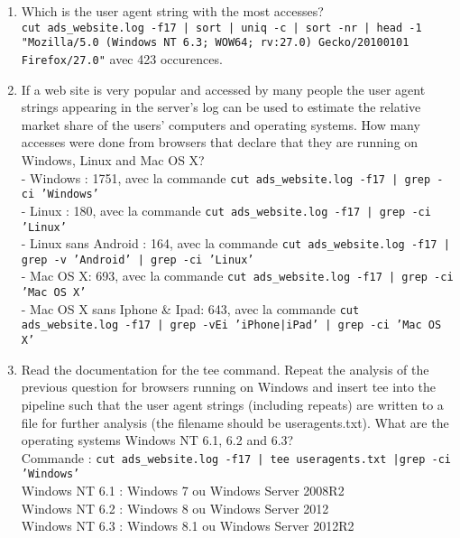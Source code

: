 \documentclass[a4paper,11pt]{article}
\newcounter{commande}[subsection]
\begin{document}
\begin{enumerate}
  \item Which is the user agent string with the most accesses?\\
  \texttt{cut ads\_website.log -f17 | sort | uniq -c | sort -nr | head -1}\\
  \texttt{"Mozilla/5.0 (Windows NT 6.3; WOW64; rv:27.0) Gecko/20100101 Firefox/27.0"} avec 423 occurences.\\
  
  
  \item If a web site is very popular and accessed by many people the user agent strings appearing in the server's log can be used to estimate the relative market share of the users' computers and operating systems. How many accesses were done from browsers that declare that they are running on Windows, Linux and Mac OS X? \\
  - Windows : 1751, avec la commande \texttt{cut ads\_website.log -f17 | grep -ci 'Windows'} \\
  - Linux   : 180, avec la commande \texttt{cut ads\_website.log -f17 | grep -ci 'Linux' 
}\\
  - Linux sans Android  : 164, avec la commande \texttt{cut ads\_website.log -f17 | grep -v 'Android' | grep -ci 'Linux'}\\
  - Mac OS X: 693, avec la commande \texttt{cut ads\_website.log -f17 | grep -ci 'Mac OS X' 
}\\
  - Mac OS X sans Iphone \& Ipad: 643, avec la commande \texttt{cut ads\_website.log -f17 | grep -vEi 'iPhone|iPad' | grep -ci 'Mac OS X' }\\
  
  \item Read the documentation for the tee command. Repeat the analysis of the previous question for browsers running on Windows and insert tee into the pipeline such that the user agent strings (including repeats) are written to a file for further analysis (the filename should be useragents.txt). What are the operating systems Windows NT 6.1, 6.2 and 6.3?\\
  Commande : \texttt{cut ads\_website.log -f17 | tee useragents.txt |grep -ci 'Windows'}\\
  Windows NT 6.1 : Windows 7 ou Windows Server 2008R2\\
  Windows NT 6.2 : Windows 8 ou Windows Server 2012\\
  Windows NT 6.3 : Windows 8.1 ou Windows Server 2012R2\\ 
  

\end{enumerate}
\end{document}
